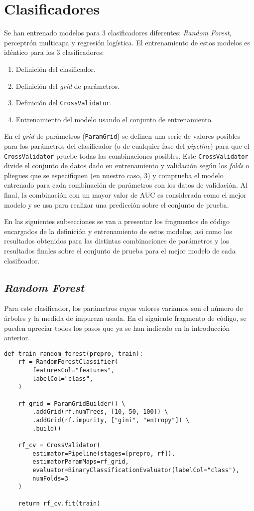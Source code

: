 \section{Clasificadores}

Se han entrenado modelos para 3 clasificadores diferentes: \textit{Random
    Forest}, perceptrón multicapa y regresión logística. El entrenamiento de estos
modelos es idéntico para los 3 clasificadores:

\begin{enumerate}
    \item Definición del clasificador.
    \item Definición del \textit{grid} de parámetros.
    \item Definición del \texttt{CrossValidator}.
    \item Entrenamiento del modelo usando el conjunto de entrenamiento.
\end{enumerate}

En el \textit{grid} de parámetros (\texttt{ParamGrid}) se definen una serie de
valores posibles para los parámetros del clasificador (o de cualquier fase del
\textit{pipeline}) para que el \texttt{CrossValidator} pruebe todas las
combinaciones posibles. Este \texttt{CrossValidator} divide el conjunto de datos
dado en entrenamiento y validación según los \textit{folds} o pliegues que se
especifiquen (en nuestro caso, 3) y comprueba el modelo entrenado para cada
combinación de parámetros con los datos de validación. Al final, la combinación
con un mayor valor de AUC es considerada como el mejor modelo y se usa para
realizar una predicción sobre el conjunto de prueba.

En las siguientes subsecciones se van a presentar los fragmentos de código
encargados de la definición y entrenamiento de estos modelos, así como los
resultados obtenidos para las distintas combinaciones de parámetros y los
resultados finales sobre el conjunto de prueba para el mejor modelo de cada
clasificador.

\subsection{\textit{Random Forest}}

Para este clasificador, los parámetros cuyos valores variamos son el número de
árboles y la medida de impureza usada. En el siguiente fragmento de código, se
pueden apreciar todos los pasos que ya se han indicado en la introducción
anterior.

\begin{lstlisting}
def train_random_forest(prepro, train):
    rf = RandomForestClassifier(
        featuresCol="features",
        labelCol="class",
    )

    rf_grid = ParamGridBuilder() \
        .addGrid(rf.numTrees, [10, 50, 100]) \
        .addGrid(rf.impurity, ["gini", "entropy"]) \
        .build()

    rf_cv = CrossValidator(
        estimator=Pipeline(stages=[prepro, rf]),
        estimatorParamMaps=rf_grid,
        evaluator=BinaryClassificationEvaluator(labelCol="class"),
        numFolds=3
    )

    return rf_cv.fit(train)
\end{lstlisting}

